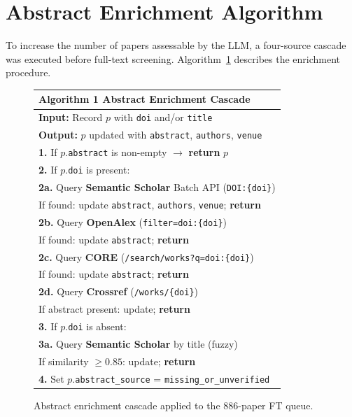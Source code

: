 \section{Abstract Enrichment Algorithm}
\label{app:slr-enrichment}

To increase the number of papers assessable by the LLM, a four-source
cascade was executed before full-text screening.
Algorithm~\ref{alg:enrichment} describes the enrichment procedure.

\begin{figure}[htbp]
\centering
\small
\begin{tabular}{l}
\hline
\textbf{Algorithm 1} \quad Abstract Enrichment Cascade \\
\hline
\textbf{Input:} Record $p$ with \texttt{doi} and/or \texttt{title} \\
\textbf{Output:} $p$ updated with \texttt{abstract}, \texttt{authors}, \texttt{venue} \\
\hline
\textbf{1.} If $p$.\texttt{abstract} is non-empty $\rightarrow$ \textbf{return} $p$ \\
\textbf{2.} If $p$.\texttt{doi} is present: \\
\quad\textbf{2a.} Query \textbf{Semantic Scholar} Batch API (\texttt{DOI:\{doi\}}) \\
\quad\quad If found: update \texttt{abstract}, \texttt{authors}, \texttt{venue};
           \textbf{return} \\
\quad\textbf{2b.} Query \textbf{OpenAlex} (\texttt{filter=doi:\{doi\}}) \\
\quad\quad If found: update \texttt{abstract}; \textbf{return} \\
\quad\textbf{2c.} Query \textbf{CORE} (\texttt{/search/works?q=doi:\{doi\}}) \\
\quad\quad If found: update \texttt{abstract}; \textbf{return} \\
\quad\textbf{2d.} Query \textbf{Crossref} (\texttt{/works/\{doi\}}) \\
\quad\quad If abstract present: update; \textbf{return} \\
\textbf{3.} If $p$.\texttt{doi} is absent: \\
\quad\textbf{3a.} Query \textbf{Semantic Scholar} by title (fuzzy) \\
\quad\quad If similarity $\geq 0.85$: update; \textbf{return} \\
\textbf{4.} Set $p$.\texttt{abstract\_source} = \texttt{missing\_or\_unverified} \\
\hline
\end{tabular}
\caption{Abstract enrichment cascade applied to the 886-paper FT queue.}
\label{alg:enrichment}
\end{figure}

